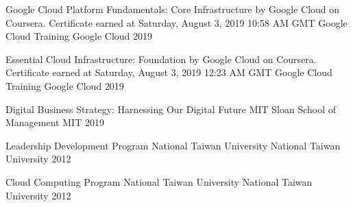 

\begin{cvhonors}

  \cvhonor
    {Google Cloud Platform Fundamentals: Core Infrastructure by Google Cloud on Coursera. Certificate earned at Saturday, August 3, 2019 10:58 AM GMT} %
    {Google Cloud Training} %
    {Google Cloud} %
    {2019} %

  \cvhonor
    {Essential Cloud Infrastructure: Foundation by Google Cloud on Coursera. Certificate earned at Saturday, August 3, 2019 12:23 AM GMT} %
    {Google Cloud Training} %
    {Google Cloud} %
    {2019} %

  \cvhonor
    {Digital Business Strategy: Harnessing Our Digital Future} %
    {MIT Sloan School of Management} %
    {MIT} %
    {2019} %

  \cvhonor
    {Leadership Development Program} %
    {National Taiwan University} %
    {National Taiwan University} %
    {2012} %

  \cvhonor
    {Cloud Computing Program} %
    {National Taiwan University} %
    {National Taiwan University} %
    {2012} %

\end{cvhonors}
